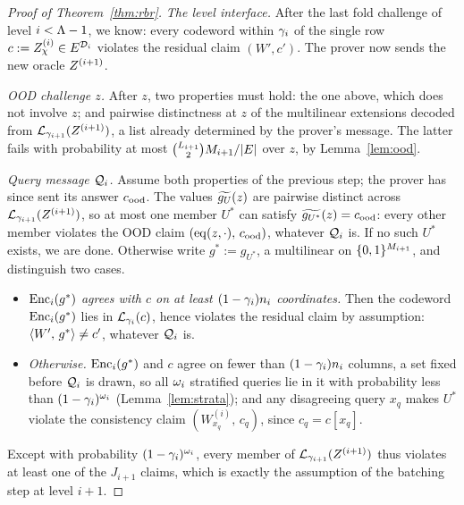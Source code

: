 \begin{proof}[Proof of Theorem~\ref{thm:rbr}]
\medskip\noindent\emph{The level interface.}
After the last fold challenge of level $i < \Lambda - 1$, we know: every codeword within $\gamma_i$ of the single row $c := Z^{(i)}_\chi \in E^{\mathcal{D}_i}$ violates the residual claim $(W', c')$. The prover now sends the new oracle $Z^{(i+1)}$.

\medskip\noindent\emph{OOD challenge $z$.}
After $z$, two properties must hold: the one above, which does not involve $z$; and pairwise distinctness at $z$ of the multilinear extensions decoded from $\mathcal{L}_{\gamma_{i+1}}(Z^{(i+1)})$, a list already determined by the prover's message. The latter fails with probability at most $\binom{L_{i+1}}{2} M_{i+1} / |E|$ over $z$, by Lemma~\ref{lem:ood}.

\medskip\noindent\emph{Query message $\mathcal{Q}_i$.}
Assume both properties of the previous step; the prover has since sent its answer $c_{\mathrm{ood}}$. The values $\widetilde{g_U}(z)$ are pairwise distinct across $\mathcal{L}_{\gamma_{i+1}}(Z^{(i+1)})$, so at most one member $U^\ast$ can satisfy $\widetilde{g_{U^\ast}}(z) = c_{\mathrm{ood}}$: every other member violates the OOD claim $(\operatorname{eq}(z, \cdot),\, c_{\mathrm{ood}})$, whatever $\mathcal{Q}_i$ is. If no such $U^\ast$ exists, we are done. Otherwise write $g^\ast := g_{U^\ast}$, a multilinear on $\{0,1\}^{M_{i+1}}$, and distinguish two cases.
\begin{itemize}[itemsep=1pt]
\item \emph{$\mathrm{Enc}_i(g^\ast)$ agrees with $c$ on at least $(1 - \gamma_i) n_i$ coordinates.} Then the codeword $\mathrm{Enc}_i(g^\ast)$ lies in $\mathcal{L}_{\gamma_i}(c)$, hence violates the residual claim by assumption: $\langle W',\, g^\ast \rangle \neq c'$, whatever $\mathcal{Q}_i$ is.
\item \emph{Otherwise.} $\mathrm{Enc}_i(g^\ast)$ and $c$ agree on fewer than $(1 - \gamma_i)n_i$ columns, a set fixed before $\mathcal{Q}_i$ is drawn, so all $\omega_i$ stratified queries lie in it with probability less than $(1 - \gamma_i)^{\omega_i}$ (Lemma~\ref{lem:strata}); and any disagreeing query $x_q$ makes $U^\ast$ violate the consistency claim $(W^{(i)}_{x_q},\, c_q)$, since $c_q = c[x_q]$.
\end{itemize}
Except with probability $(1 - \gamma_i)^{\omega_i}$, every member of $\mathcal{L}_{\gamma_{i+1}}(Z^{(i+1)})$ thus violates at least one of the $J_{i+1}$ claims, which is exactly the assumption of the batching step at level $i + 1$.


\end{proof}
